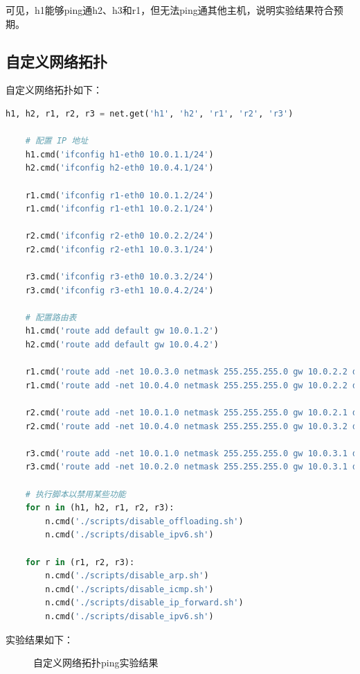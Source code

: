 \documentclass[UTF8]{report}
\begin{document}
可见，h1能够ping通h2、h3和r1，但无法ping通其他主机，说明实验结果符合预期。

\subsection{自定义网络拓扑}

自定义网络拓扑如下：

\begin{lstlisting}[language=python]
    h1, h2, r1, r2, r3 = net.get('h1', 'h2', 'r1', 'r2', 'r3')

    # 配置 IP 地址
    h1.cmd('ifconfig h1-eth0 10.0.1.1/24')
    h2.cmd('ifconfig h2-eth0 10.0.4.1/24')

    r1.cmd('ifconfig r1-eth0 10.0.1.2/24')
    r1.cmd('ifconfig r1-eth1 10.0.2.1/24')
    
    r2.cmd('ifconfig r2-eth0 10.0.2.2/24')
    r2.cmd('ifconfig r2-eth1 10.0.3.1/24')
    
    r3.cmd('ifconfig r3-eth0 10.0.3.2/24')
    r3.cmd('ifconfig r3-eth1 10.0.4.2/24')

    # 配置路由表
    h1.cmd('route add default gw 10.0.1.2')
    h2.cmd('route add default gw 10.0.4.2')

    r1.cmd('route add -net 10.0.3.0 netmask 255.255.255.0 gw 10.0.2.2 dev r1-eth1')
    r1.cmd('route add -net 10.0.4.0 netmask 255.255.255.0 gw 10.0.2.2 dev r1-eth1')

    r2.cmd('route add -net 10.0.1.0 netmask 255.255.255.0 gw 10.0.2.1 dev r2-eth0')
    r2.cmd('route add -net 10.0.4.0 netmask 255.255.255.0 gw 10.0.3.2 dev r2-eth1')

    r3.cmd('route add -net 10.0.1.0 netmask 255.255.255.0 gw 10.0.3.1 dev r3-eth0')
    r3.cmd('route add -net 10.0.2.0 netmask 255.255.255.0 gw 10.0.3.1 dev r3-eth0')

    # 执行脚本以禁用某些功能
    for n in (h1, h2, r1, r2, r3):
        n.cmd('./scripts/disable_offloading.sh')
        n.cmd('./scripts/disable_ipv6.sh')

    for r in (r1, r2, r3):
        n.cmd('./scripts/disable_arp.sh')
        n.cmd('./scripts/disable_icmp.sh')
        n.cmd('./scripts/disable_ip_forward.sh')
        n.cmd('./scripts/disable_ipv6.sh')
\end{lstlisting}

实验结果如下：

\begin{figure}[H]
    \centering
    \caption{自定义网络拓扑ping实验结果}
\end{figure}
\end{document}
